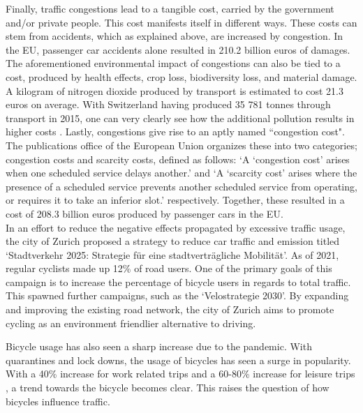Finally, traffic congestions lead to a tangible cost, carried by the government and/or private people. This cost manifests itself in different ways. These costs can stem from accidents, which as explained above, are increased by congestion. In the EU, passenger car accidents alone resulted in 210.2 billion euros of damages. \cite{eurocomm} The aforementioned environmental impact of congestions can also be tied to a cost, produced by health effects, crop loss, biodiversity loss, and material damage. A kilogram of nitrogen dioxide produced by transport is estimated to cost 21.3 euros on average. With Switzerland having produced 35 781 tonnes through transport in 2015, one can very clearly see how the additional pollution results in higher costs \cite{swissno2}. Lastly, congestions give rise to an aptly named ``congestion cost". The publications office of the European Union organizes these into two categories; congestion costs and scarcity costs, defined as follows: `A ‘congestion cost’ arises when one scheduled service delays another.' \cite{eurocomm} and `A ‘scarcity cost’ arises where the presence of a scheduled service prevents another scheduled service from operating, or requires it to take an inferior slot.' \cite{eurocomm} respectively. Together, these resulted in a cost of 208.3 billion euros produced by passenger cars in the EU. \cite{eurocomm}
\\
In an effort to reduce the negative effects propagated by excessive traffic usage, the city of Zurich proposed a strategy to reduce car traffic and emission titled `Stadtverkehr 2025: Strategie für eine stadtverträgliche Mobilität'. \cite{strategie25} As of 2021, regular cyclists made up 12\% of road users. \cite{bericht21} One of the primary goals of this campaign is to increase the percentage of bicycle users in regards to total traffic. This spawned further campaigns, such as the `Velostrategie 2030'. By expanding and improving the existing road network, the city of Zurich aims to promote cycling as an environment friendlier alternative to driving. \cite{velo2030}

Bicycle usage has also seen a sharp increase due to the pandemic. With quarantines and lock downs, the usage of bicycles has seen a surge in popularity. With a 40\% increase for work related trips and a 60-80\% increase for leisure trips \cite{covid, mobis}, a trend towards the bicycle becomes clear. This raises the question of how bicycles influence traffic.

